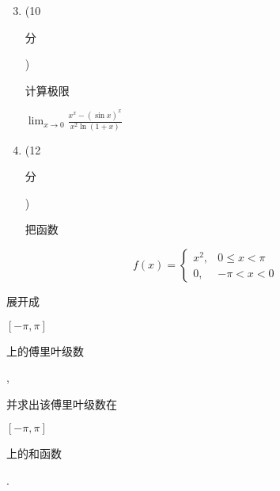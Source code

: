 \documentclass[10pt]{article}
\begin{document}
\begin{enumerate}
  \setcounter{enumi}{2}
  \item (10 \begin{CJK}{UTF8}{mj}分\end{CJK}) \begin{CJK}{UTF8}{mj}计算极限\end{CJK} $\lim _{x \rightarrow 0} \frac{x^{x}-(\sin x)^{x}}{x^{2} \ln (1+x)}$

  \item (12 \begin{CJK}{UTF8}{mj}分\end{CJK}) \begin{CJK}{UTF8}{mj}把函数\end{CJK}

\end{enumerate}
$$
f(x)= \begin{cases}x^{2}, & 0 \leqslant x<\pi \\ 0, & -\pi<x<0\end{cases}
$$
\begin{CJK}{UTF8}{mj}展开成\end{CJK} $[-\pi, \pi]$ \begin{CJK}{UTF8}{mj}上的傅里叶级数\end{CJK}, \begin{CJK}{UTF8}{mj}并求出该傅里叶级数在\end{CJK} $[-\pi, \pi]$ \begin{CJK}{UTF8}{mj}上的和函数\end{CJK}.
\end{document}
